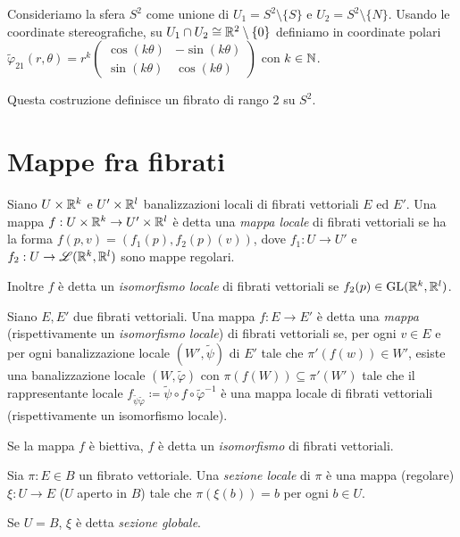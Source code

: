\begin{example}
	Consideriamo la sfera $S^2$ come unione di $U_1 = S^2\setminus \{S\}$ e $U_2 = S^2\setminus \{N\}$. Usando le coordinate stereografiche, su $U_1\cap U_2\cong \mathbb R^2\setminus\{0\}$ definiamo in coordinate polari $\tilde\varphi_{21}(r,\theta) = r^k \left(\begin{matrix} \cos(k\theta)& -\sin(k\theta)\\ \sin(k\theta)& \cos(k\theta) \end{matrix}\right)$ con $k\in\mathbb N$.
	
	Questa costruzione definisce un fibrato di rango 2 su $S^2$.
\end{example}


\section{Mappe fra fibrati}

\begin{definition}  
	Siano $U\times\mathbb R^k$ e $U'\times\mathbb R^l$ banalizzazioni locali di fibrati vettoriali $E$ ed $E'$. Una mappa $f:U\times\mathbb R^k\to U'\times\mathbb R^l$ è detta una \emph{mappa locale} di fibrati vettoriali se ha la forma $f(p,v) = (f_1(p), f_2(p)(v) )$, dove $f_1:U\to U'$ e $f_2:U \to \mathscr L(\mathbb R^k,\mathbb R^l)$ sono mappe regolari.
	
	Inoltre $f$ è detta un \emph{isomorfismo locale} di fibrati vettoriali se $f_2(p)\in \mathrm{GL}(\mathbb R^k,\mathbb R^l)$.
\end{definition}


\begin{definition}  
	Siano $E,E'$ due fibrati vettoriali. Una mappa $f:E \to E'$ è detta una \emph{mappa} (rispettivamente un \emph{isomorfismo locale}) di fibrati vettoriali se, per ogni $v \in E$ e per ogni banalizzazione locale $(W',\tilde\psi)$ di $E'$ tale che $\pi'(f(w))\in W'$, esiste una banalizzazione locale $(W,\tilde\varphi)$ con $\pi(f(W))\subseteq \pi'(W')$ tale che il rappresentante locale $f_{\tilde\psi\tilde\varphi}\coloneqq \tilde\psi\circ f \circ \tilde\varphi^{-1}$ è una mappa locale di fibrati vettoriali (rispettivamente un isomorfismo locale).
	
	Se la mappa $f$ è biettiva, $f$ è detta un \emph{isomorfismo} di fibrati vettoriali.
\end{definition}


\begin{definition}  
	Sia $\pi:E\in B$ un fibrato vettoriale. Una \emph{sezione locale} di $\pi$ è una mappa (regolare) $\xi:U \to E$ ($U$ aperto in $B$) tale che $\pi(\xi(b)) = b$ per ogni $b\in U$.
	
	Se $U = B$, $\xi$ è detta \emph{sezione globale}.
\end{definition}

